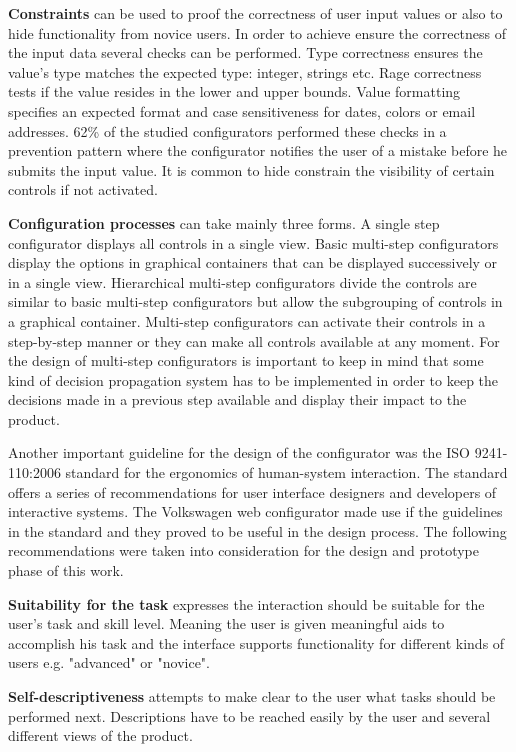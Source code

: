 \documentclass[../medieninformatik-arbeit.tex]{subfiles}
\begin{document}
\textbf{Constraints} can be used to proof the correctness of user input values or also to hide functionality from novice users. In order to achieve ensure the correctness of the input data several checks can be performed. Type correctness ensures the value's type matches the expected type: integer, strings etc. Rage correctness tests if the value resides in the lower and upper bounds. Value formatting specifies an expected format and case sensitiveness for dates, colors or email addresses. 62\% of the studied configurators performed these checks in a prevention pattern where the configurator notifies the user of a mistake before he submits the input value. It is common to hide constrain the visibility of certain controls if not activated. 

\textbf{Configuration processes} can take mainly three forms. A single step configurator displays all controls in a single view. Basic multi-step configurators display the options in graphical containers that can be displayed successively or in a single view. Hierarchical multi-step configurators divide the controls are similar to basic multi-step configurators but allow the subgrouping of controls in a graphical container. Multi-step configurators can activate their controls in a step-by-step manner or they can make all controls available at any moment. For the design of multi-step configurators is important to keep in mind that some kind of decision propagation system has to be implemented in order to keep the decisions made in a previous step available and display their impact to the product.

Another important guideline for the design of the configurator was the ISO 9241-110:2006 standard for the ergonomics of human-system interaction\cite{fdis20069241}. The standard offers a series of recommendations for user interface designers and developers of interactive systems. The Volkswagen web configurator made use if the guidelines in the standard and they proved to be useful in the design process\cite{Konstanzer20078609220}. The following recommendations were taken into consideration for the design and prototype phase of this work. 

\textbf{Suitability for the task} expresses the interaction should be suitable for the user's task and skill level. Meaning the user is given meaningful aids to accomplish his task and the interface supports functionality for different kinds of users e.g. "advanced" or "novice".

\textbf{Self-descriptiveness} attempts to make clear to the user what tasks should be performed next. Descriptions have to be reached easily by the user and several different views of the product.
\end{document}
